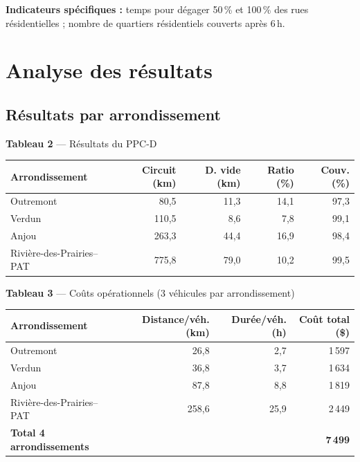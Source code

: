 \documentclass[11pt,a4paper]{article}
\begin{document}
\noindent\textbf{Indicateurs sp\'ecifiques :}
temps pour d\'egager 50\,\% et 100\,\% des rues r\'esidentielles ;
nombre de quartiers r\'esidentiels couverts apr\`es 6\,h.

\section{Analyse des r\'esultats}

\subsection{R\'esultats par arrondissement}

\begin{center}
\textbf{Tableau 2} --- R\'esultats du PPC-D\\[0.5em]
\begin{tabular}{|l|r|r|r|r|}
\hline
\textbf{Arrondissement} & \textbf{Circuit (km)} & \textbf{D. vide (km)} & \textbf{Ratio (\%)} & \textbf{Couv. (\%)} \\
\hline
Outremont              &   80,5 & 11,3 & 14,1 & 97,3 \\
Verdun                 &  110,5 &  8,6 &  7,8 & 99,1 \\
Anjou                  &  263,3 & 44,4 & 16,9 & 98,4 \\
Rivi\`ere-des-Prairies--PAT &  775,8 & 79,0 & 10,2 & 99,5 \\
\hline
\end{tabular}
\end{center}

\medskip
\begin{center}
\textbf{Tableau 3} --- Co\^uts op\'erationnels (3 v\'ehicules par arrondissement)\\[0.5em]
\begin{tabular}{|l|r|r|r|}
\hline
\textbf{Arrondissement} & \textbf{Distance/v\'eh. (km)} & \textbf{Dur\'ee/v\'eh. (h)} & \textbf{Co\^ut total (\$)} \\
\hline
Outremont              &  26,8 &  2,7 &  1\,597 \\
Verdun                 &  36,8 &  3,7 &  1\,634 \\
Anjou                  &  87,8 &  8,8 &  1\,819 \\
Rivi\`ere-des-Prairies--PAT & 258,6 & 25,9 &  2\,449 \\
\hline
\textbf{Total 4 arrondissements} & & & \textbf{7\,499} \\
\hline
\end{tabular}
\end{center}
\end{document}
